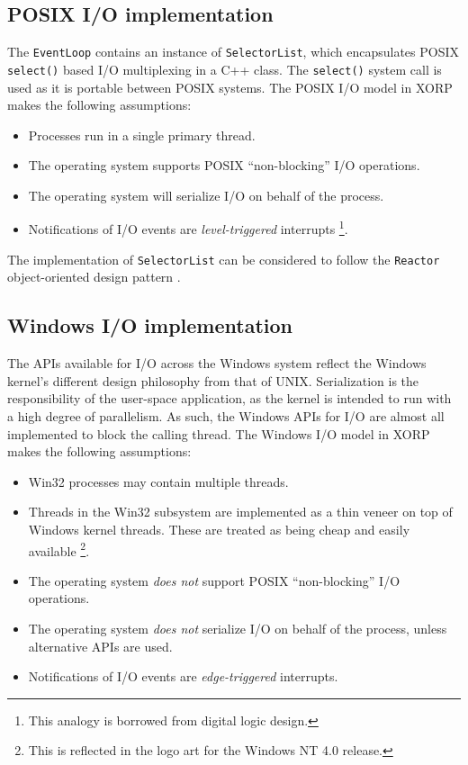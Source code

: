 \documentclass[11pt]{article}
\begin{document}
\subsection{POSIX I/O implementation}

The {\tt EventLoop} contains an instance of {\tt SelectorList},
which encapsulates POSIX {\tt select()} based I/O multiplexing
in a C++ class.
The {\tt select()} system call
is used as it is portable between POSIX systems.
The POSIX I/O model in XORP makes the following assumptions:
\begin{itemize}
 \item Processes run in a single primary thread.
 \item The operating system supports POSIX ``non-blocking'' I/O operations.
 \item The operating system will serialize I/O on behalf of the process.
 \item Notifications of I/O events are {\em level-triggered} interrupts
       \footnote{This analogy is borrowed from digital logic design.}.
\end{itemize}

The implementation of {\tt SelectorList} can be considered to follow
the {\tt Reactor} object-oriented design pattern \cite{schmidt:reactor}.

\subsection{Windows I/O implementation}

The APIs available for I/O across the Windows system reflect the
Windows kernel's different design philosophy from that of UNIX.
Serialization is the responsibility of the user-space application,
as the kernel is intended to run with a high degree of parallelism.
As such, the Windows APIs for I/O are almost all implemented to block
the calling thread.
The Windows I/O model in XORP makes the following assumptions:
\begin{itemize}
 \item Win32 processes may contain multiple threads.
 \item Threads in the Win32 subsystem are implemented as
       a thin veneer on top of Windows kernel threads.
       These are treated as being cheap and easily available
       \footnote{This is reflected in the logo art for the Windows NT 4.0 release.}.
 \item The operating system {\em does not} support POSIX ``non-blocking'' I/O operations.
 \item The operating system {\em does not} serialize I/O on behalf of the process,
       unless alternative APIs are used.
 \item Notifications of I/O events are {\em edge-triggered} interrupts.
\end{itemize}
\end{document}
